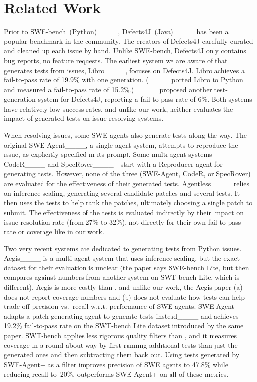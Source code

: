 \section{Related Work}
\label{sec:related}


Prior to SWE-bench~(Python)____,
Defects4J~(Java)____ has been a popular benchmark
in the community.
The creators of Defects4J carefully curated and cleaned up each issue
by hand.
Unlike SWE-bench, Defects4J only contains bug reports, no feature
requests.
The earliest system we are aware of that generates tests from issues,
Libro____, focuses on Defects4J.
Libro achieves a fail-to-pass rate of 19.9\% with one generation.
(____ ported Libro to Python and measured a
fail-to-pass rate of 15.2\%.)
____ proposed another test-generation system for
Defects4J, reporting a fail-to-pass rate of 6\%.
Both systems have relatively low success rates, and
unlike our work, neither evaluates the impact of generated tests on
issue-resolving systems.

When resolving issues, some SWE agents also generate tests along the
way.
The original
SWE-Agent____, a single-agent system, attempts to reproduce the issue,
as explicitly specified in its prompt.
Some multi-agent systems---CodeR____ and SpecRover____---start with a Reproducer agent for generating tests.
However, none of the three (SWE-Agent, CodeR, or SpecRover)
are evaluated for the effectiveness of their generated tests.
Agentless____ relies on inference
scaling, generating several candidate patches and several
tests.
It then uses the tests to help rank the patches, ultimately choosing a
single patch to submit.
The effectiveness of the tests is evaluated indirectly by their impact
on issue resolution rate (from 27\% to 32\%), not directly for their
own fail-to-pass rate or coverage like in our work.

Two very recent systems are dedicated to generating tests from Python
issues.
Aegis____ is a multi-agent system that uses inference
scaling, but the exact dataset for their evaluation
is unclear (the paper says SWE-bench Lite, but then compares against
numbers from another system on SWT-bench Lite, which is different).
Aegis is more costly than \soly, and unlike our
work, the Aegis paper (a) does not report coverage numbers and (b) does not evaluate how tests can help trade off precision vs.\ recall w.r.t. performance of SWE agents.
SWE-Agent+ adapts a patch-generating agent to generate tests
instead____ and achieves 19.2\% fail-to-pass rate on the SWT-bench Lite dataset
introduced by the same paper.
SWT-bench applies less rigorous quality filters than \tdd, and it
measures coverage in a round-about way by first running additional
tests than just the generated ones and then subtracting them back out.
Using tests generated by SWE-Agent+ as a filter improves precision
of SWE agents to 47.8\% while reducing recall to~20\%.
\soly outperforms SWE-Agent+ on all of these metrics.